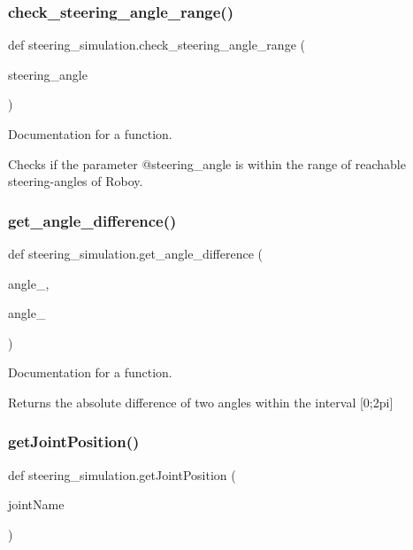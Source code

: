 \subsubsection{\texorpdfstring{check\_steering\_angle\_range()}{check\_steering\_angle\_range()}}
{\footnotesize\ttfamily def steering\+\_\+simulation.\+check\+\_\+steering\+\_\+angle\+\_\+range (\begin{DoxyParamCaption}\item[{}]{steering\+\_\+angle }\end{DoxyParamCaption})}



Documentation for a function. 

Checks if the parameter @steering\+\_\+angle is within the range of reachable steering-\/angles of Roboy. \mbox{\label{namespacesteering__simulation_a920f69692c79162b2296b1a220bba527}} 
\subsubsection{\texorpdfstring{get\_angle\_difference()}{get\_angle\_difference()}}
{\footnotesize\ttfamily def steering\+\_\+simulation.\+get\+\_\+angle\+\_\+difference (\begin{DoxyParamCaption}\item[{}]{angle\+\_,  }\item[{}]{angle\+\_ }\end{DoxyParamCaption})}



Documentation for a function. 

Returns the absolute difference of two angles within the interval \mbox{[}0;2pi\mbox{]} \mbox{\label{namespacesteering__simulation_a058dbff61afc8af058769267605ffc5a}} 
\subsubsection{\texorpdfstring{getJointPosition()}{getJointPosition()}}
{\footnotesize\ttfamily def steering\+\_\+simulation.\+get\+Joint\+Position (\begin{DoxyParamCaption}\item[{}]{joint\+Name }\end{DoxyParamCaption})}



